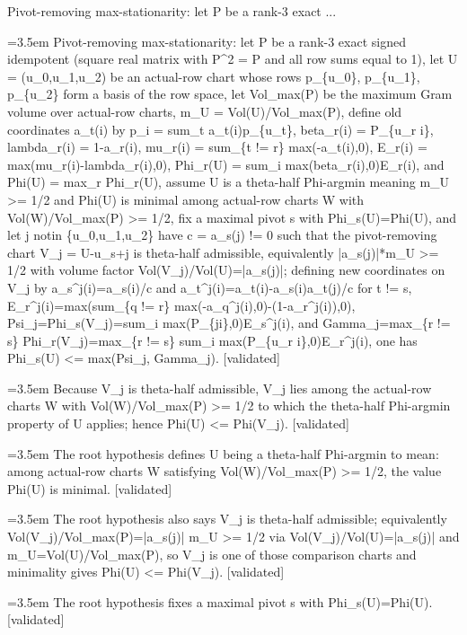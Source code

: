 \documentclass{article}
\newcommand{\step}[1]{\par\noindent\hangindent=3.5em\hangafter=1%
  \makebox[3.5em][l]{\textbf{#1.}}}
\newcommand{\steptag}[1]{\hfill{\small\textsf{[#1]}}}
\begin{document}
\begin{proofbox}{Pivot-removing max-stationarity: let P be a rank-3 exact ...}
\step{1} Pivot-removing max-stationarity: let P be a rank-3 exact signed idempotent (square real matrix with P\textasciicircum{}2 = P and all row sums equal to 1), let U = (u\_0,u\_1,u\_2) be an actual-row chart whose rows p\_\{u\_0\}, p\_\{u\_1\}, p\_\{u\_2\} form a basis of the row space, let Vol\_max(P) be the maximum Gram volume over actual-row charts, m\_U = Vol(U)/Vol\_max(P), define old coordinates a\_t(i) by p\_i = sum\_t a\_t(i)p\_\{u\_t\}, beta\_r(i) = P\_\{u\_r i\}, lambda\_r(i) = 1-a\_r(i), mu\_r(i) = sum\_\{t != r\} max(-a\_t(i),0), E\_r(i) = max(mu\_r(i)-lambda\_r(i),0), Phi\_r(U) = sum\_i max(beta\_r(i),0)E\_r(i), and Phi(U) = max\_r Phi\_r(U), assume U is a theta-half Phi-argmin meaning m\_U >= 1/2 and Phi(U) is minimal among actual-row charts W with Vol(W)/Vol\_max(P) >= 1/2, fix a maximal pivot s with Phi\_s(U)=Phi(U), and let j notin \{u\_0,u\_1,u\_2\} have c = a\_s(j) != 0 such that the pivot-removing chart V\_j = U-u\_s+j is theta-half admissible, equivalently |a\_s(j)|*m\_U >= 1/2 with volume factor Vol(V\_j)/Vol(U)=|a\_s(j)|; defining new coordinates on V\_j by a\_s\textasciicircum{}j(i)=a\_s(i)/c and a\_t\textasciicircum{}j(i)=a\_t(i)-a\_s(i)a\_t(j)/c for t != s, E\_r\textasciicircum{}j(i)=max(sum\_\{q != r\} max(-a\_q\textasciicircum{}j(i),0)-(1-a\_r\textasciicircum{}j(i)),0), Psi\_j=Phi\_s(V\_j)=sum\_i max(P\_\{ji\},0)E\_s\textasciicircum{}j(i), and Gamma\_j=max\_\{r != s\} Phi\_r(V\_j)=max\_\{r != s\} sum\_i max(P\_\{u\_r i\},0)E\_r\textasciicircum{}j(i), one has Phi\_s(U) <= max(Psi\_j, Gamma\_j). \steptag{validated} \\[6pt]
\step{1.1} Because V\_j is theta-half admissible, V\_j lies among the actual-row charts W with Vol(W)/Vol\_max(P) >= 1/2 to which the theta-half Phi-argmin property of U applies; hence Phi(U) <= Phi(V\_j). \steptag{validated} \\[6pt]
\step{1.1.1} The root hypothesis defines U being a theta-half Phi-argmin to mean: among actual-row charts W satisfying Vol(W)/Vol\_max(P) >= 1/2, the value Phi(U) is minimal. \steptag{validated} \\[4pt]
\step{1.1.2} The root hypothesis also says V\_j is theta-half admissible; equivalently Vol(V\_j)/Vol\_max(P)=|a\_s(j)| m\_U >= 1/2 via Vol(V\_j)/Vol(U)=|a\_s(j)| and m\_U=Vol(U)/Vol\_max(P), so V\_j is one of those comparison charts and minimality gives Phi(U) <= Phi(V\_j). \steptag{validated} \\[4pt]
\step{1.2} The root hypothesis fixes a maximal pivot s with Phi\_s(U)=Phi(U). \steptag{validated} \\[4pt]

\end{proofbox}
\end{document}

